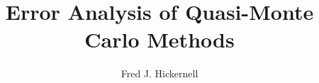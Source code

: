 \documentclass[graybox,footinfo]{svmult}
\begin{document}
	\newtheorem{FJHLesson}{Lesson}
\newcommand{\corr}{\mathrm{corr}}
\newcommand{\std}{\textup{std}}
\newcommand{\Dt}{\textup{D}}
\newcommand{\Rn}{\textup{R}}


\newcommand{\mC}{\mathsf{C}}
\newcommand{\Ex}{\mathbb{E}}
\newcommand{\Prob}{\mathbb{P}}
\newcommand{\cf}{\mathcal{F}}
\newcommand{\cl}{\mathcal{L}}
\newcommand{\cn}{\mathcal{N}}
\newcommand{\Order}{\mathcal{O}}
\newcommand{\cm}{\mathcal{M}}
\newcommand{\cg}{\mathcal{G}}
\newcommand{\cp}{\mathcal{P}}
\newcommand{\cu}{\mathcal{U}}
\newcommand{\cx}{\mathcal{X}}
\newcommand{\cy}{\mathcal{Y}}
\newcommand{\cz}{\mathcal{Z}}
\newcommand{\natm}{\N_{0,m}}
\newcommand{\cube}{[0,1)^d}
\newcommand{\hf}{\hat{f}}
\newcommand{\rf}{\mathring{f}}
\newcommand{\tf}{\tilde{f}}
\newcommand{\hg}{\hat{g}}
\newcommand{\hmu}{\widehat{\mu}}
\newcommand{\hI}{\hat{I}}
\newcommand{\tvk}{\tilde{\bsk}}
\newcommand{\hS}{\widehat{S}}
\newcommand{\tS}{\widetilde{S}}
\newcommand{\wcS}{\widecheck{S}}
\newcommand{\rnu}{\mathring{\nu}}
\newcommand{\tnu}{\widetilde{\nu}}
\newcommand{\hnu}{\widehat{\nu}}
\newcommand{\homega}{\widehat{\omega}}
\newcommand{\wcomega}{\mathring{\omega}}
\newcommand{\fC}{\mathfrak{C}}
\newcommand{\nodes}{\{\bsz_i\}_{i=0}^{\infty}}
\newcommand{\nodesn}{\{\bsz_i\}_{i=0}^{n-1}}
\newcommand{\norm}[1]{\ensuremath{\left \lVert #1 \right \rVert}} 
\newcommand{\snorm}[1]{\ensuremath{\left \lVert #1 \right \rVert}} 
\newcommand{\bignorm}[1]{\ensuremath{\bigl \lVert #1 \bigr \rVert}}
\newcommand{\Bignorm}[1]{\ensuremath{\Bigl \lVert #1 \Bigr \rVert}}
\newcommand{\abs}[1]{\ensuremath{\bigl \lvert #1 \bigr \rvert}}
\newcommand{\bigabs}[1]{\ensuremath{\bigl \lvert #1 \bigr \rvert}}
\newcommand{\Bigabs}[1]{\ensuremath{\Bigl \lvert #1 \Bigr \rvert}}
\newcommand{\biggabs}[1]{\ensuremath{\biggl \lvert #1 \biggr \rvert}}
\newcommand{\Biggabs}[1]{\ensuremath{\Biggl \lvert #1 \Biggr \rvert}}
\newcommand{\ip}[3][{}]{\ensuremath{\left \langle #2, #3 \right \rangle_{#1}}}
\newcommand{\err}{\textrm{err}}
\newcommand{\tbsone}{\tilde{\bsone}}
\newcommand{\tvarrho}{\tilde{\varrho}}
\newcommand{\rvarrho}{\mathring{\varrho}}
\newcommand{\tc}{\tilde{c}}
\newcommand{\tbsc}{\tilde{\bsc}}
\newcommand{\tbsy}{\tilde{\bsy}}
\newcommand{\tmC}{\widetilde{\mC}}
\newcommand{\tz}{\tilde{z}}
\newcommand{\tbsz}{\tilde{\bsz}}

\allowdisplaybreaks


\title*{Error Analysis of Quasi-Monte Carlo Methods}
\author{Fred J. Hickernell}
\maketitle
\end{document}

